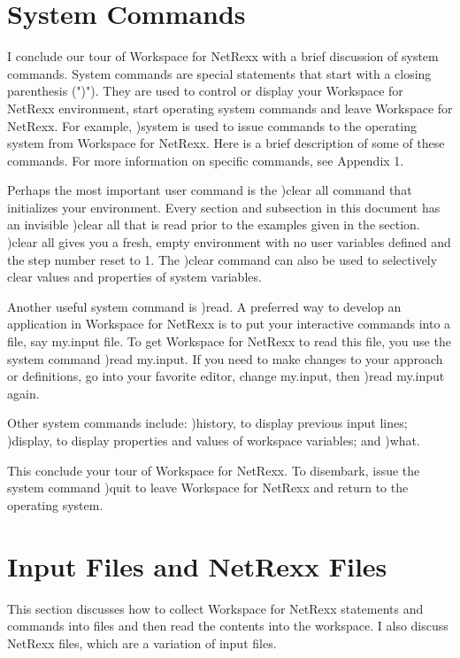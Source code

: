  \section{System Commands}

I conclude our tour of Workspace for NetRexx with a brief discussion of system commands. System commands are special statements that start with a closing parenthesis (")"). They are used to control or display your Workspace for NetRexx environment, start operating system commands and leave Workspace for NetRexx. For example, )system is used to issue commands to the operating system from Workspace for NetRexx. Here is a brief description of some of these commands. For more information on specific commands, see Appendix 1.

Perhaps the most important user command is the )clear all command that initializes your environment. Every section and subsection in this document has an invisible )clear all that is read prior to the examples given in the section. )clear all gives you a fresh, empty environment with no user variables defined and the step number reset to 1. The )clear command can also be used to selectively clear values and properties of system variables.

Another useful system command is )read. A preferred way to develop an application in Workspace for NetRexx is to put your interactive commands into a file, say my.input file. To get Workspace for NetRexx to read this file, you use the system command )read my.input. If you need to make changes to your approach or definitions, go into your favorite editor, change my.input, then )read my.input again.

Other system commands include: )history, to display previous input lines; )display, to display properties and values of workspace variables; and )what.

This conclude your tour of Workspace for NetRexx. To disembark, issue the system command )quit to leave Workspace for NetRexx and return to the operating system.

\section{Input Files and NetRexx Files}

This section discusses how to collect Workspace for NetRexx statements and commands into files and then read the contents into the workspace. I also discuss NetRexx files, which are a variation of input files.

